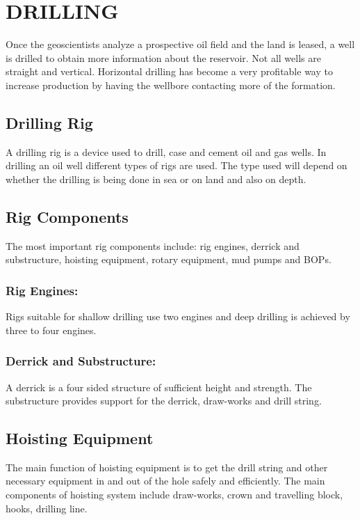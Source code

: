 \chapter{DRILLING}

Once the geoscientists analyze a prospective oil field and the land is leased,
a well is drilled to obtain more information about the reservoir. 
Not all wells are straight and vertical. Horizontal drilling has become a
 very profitable way to increase production by having the wellbore contacting more of the formation.

\section{Drilling Rig}

A drilling rig is a device used to drill, case and cement oil and gas wells. 
In drilling an oil well different types of rigs are used. The type used will
depend on whether the drilling is being done in sea or on land and also on depth.

\section{Rig Components}
The most important rig components include:
 rig engines, derrick and substructure, hoisting equipment, rotary equipment, mud pumps and BOPs.
 
 
 
 \subsection*{Rig Engines:}
 
 Rigs suitable for shallow drilling use two engines and deep drilling is achieved by three to four engines.

\subsection*{Derrick and Substructure:}

A derrick is a four sided structure of sufficient height and strength. The
substructure provides support for the derrick, draw-works and drill string.


\section{Hoisting Equipment}

The main function of hoisting equipment is to get the drill string and 
other necessary equipment in and out of the hole safely and efficiently. 
The main components of hoisting system include draw-works, crown and travelling block, hooks, drilling line.

